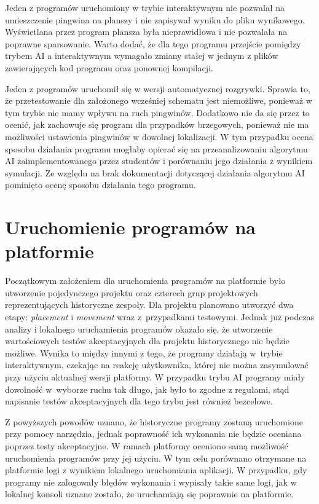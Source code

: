 Jeden z programów uruchomiony w trybie interaktywnym nie pozwalał na umieszczenie pingwina na planszy i nie zapisywał wyniku do pliku wynikowego.
Wyświetlana przez program plansza była nieprawidłowa i nie pozwalała na poprawne sparsowanie.
Warto dodać, że dla tego programu przejście pomiędzy trybem AI a interaktywnym wymagało zmiany stałej w jednym z plików zawierających kod programu oraz ponownej kompilacji.

Jeden z programów uruchomił się w wersji automatycznej rozgrywki.
Sprawia to, że przetestowanie dla założonego wcześniej schematu jest niemożliwe, ponieważ w tym trybie nie mamy wpływu na ruch pingwinów.
Dodatkowo nie da się przez to ocenić, jak zachowuje się program dla przypadków brzegowych, ponieważ nie ma możliwości ustawienia pingwinów w dowolnej lokalizacji.
W tym przypadku ocena sposobu działania programu mogłaby opierać się na przeanalizowaniu algorytmu AI zaimplementowanego przez studentów i porównaniu jego działania z wynikiem symulacji.
Ze względu na brak dokumentacji dotyczącej działania algorytmu AI pominięto ocenę sposobu działania tego programu.

\section{Uruchomienie programów na platformie}
\label{veryfication_platform}

Początkowym założeniem dla uruchomienia programów na platformie było utworzenie pojedynczego projektu oraz czterech grup projektowych reprezentujących historyczne zespoły.
Dla projektu planowano utworzyć dwa etapy: \textit{placement} i \textit{movement} wraz z~przypadkami testowymi.
Jednak już podczas analizy i lokalnego uruchamienia programów okazało się, że utworzenie wartościowych testów akceptacyjnych dla projektu historycznego nie będzie możliwe.
Wynika to między innymi z tego, że programy działają w~trybie interaktywnym, czekając na reakcję użytkownika, której nie można zasymulować przy użyciu aktualnej wersji platformy.
W przypadku trybu AI programy miały dowolność w~wyborze ruchu tak długo, jak było to zgodne z regułami, stąd napisanie testów akceptacyjnych dla tego trybu jest również bezcelowe.

Z powyższych powodów uznano, że historyczne programy zostaną uruchomione przy pomocy narzędzia, jednak poprawność ich wykonania nie będzie oceniana poprzez testy akceptacyjne.
W ramach platformy oceniono samą możliwość uruchomienia programów przy jej użyciu.
W tym celu porównano otrzymane na platformie logi z wynikiem lokalnego uruchomiania aplikacji.
W przypadku, gdy programy nie zalogowały błędów wykonania i wypisały takie same logi, jak w lokalnej konsoli uznane zostało, że uruchamiają się poprawnie na platformie.

